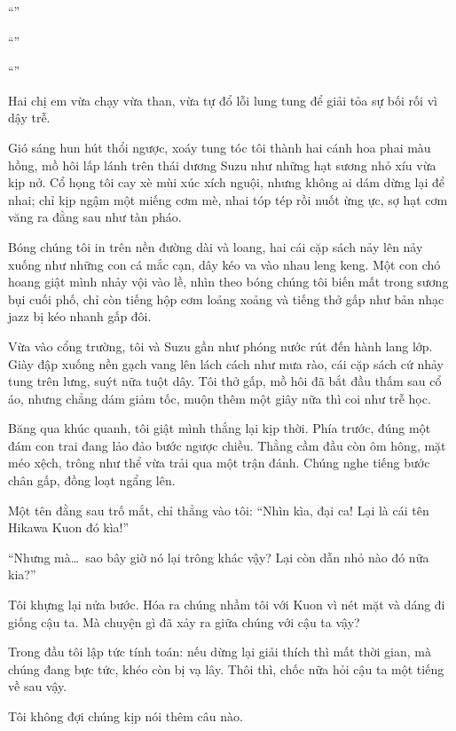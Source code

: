 \documentclass[../main.tex]{subfiles}
\begin{document}
``''

``''

``''

Hai chị em vừa chạy vừa than, vừa tự đổ lỗi lung tung để giải tỏa sự bối rối vì dậy trễ.

Gió sáng hun hút thổi ngược, xoáy tung tóc tôi thành hai cánh hoa phai màu hồng, mồ hôi lấp lánh trên thái dương Suzu như những hạt sương nhỏ xíu vừa kịp nở. Cổ họng tôi cay xè mùi xúc xích nguội, nhưng không ai dám dừng lại để nhai; chỉ kịp ngậm một miếng cơm mè, nhai tóp tép rồi nuốt ừng ực, sợ hạt cơm văng ra đằng sau như tàn pháo.

Bóng chúng tôi in trên nền đường dài và loang, hai cái cặp sách nảy lên nảy xuống như những con cá mắc cạn, dây kéo va vào nhau leng keng. Một con chó hoang giật mình nhảy vội vào lề, nhìn theo bóng chúng tôi biến mất trong sương bụi cuối phố, chỉ còn tiếng hộp cơm loảng xoảng và tiếng thở gấp như bản nhạc jazz bị kéo nhanh gấp đôi.

\ct

Vừa vào cổng trường, tôi và Suzu gần như phóng nước rút đến hành lang lớp. Giày đập xuống nền gạch vang lên lách cách như mưa rào, cái cặp sách cứ nhảy tung trên lưng, suýt nữa tuột dây. Tôi thở gấp, mồ hôi đã bắt đầu thấm sau cổ áo, nhưng chẳng dám giảm tốc, muộn thêm một giây nữa thì coi như trễ học.

Băng qua khúc quanh, tôi giật mình thắng lại kịp thời. Phía trước, đúng một đám con trai đang lảo đảo bước ngược chiều. Thằng cầm đầu còn ôm hông, mặt méo xệch, trông như thể vừa trải qua một trận đánh. Chúng nghe tiếng bước chân gấp, đồng loạt ngẩng lên.

Một tên đằng sau trố mắt, chỉ thẳng vào tôi: ``Nhìn kìa, đại ca! Lại là cái tên Hikawa Kuon đó kìa!''

``Nhưng mà\dots\ sao bây giờ nó lại trông khác vậy? Lại còn dẫn nhỏ nào đó nữa kia?''

Tôi khựng lại nửa bước. Hóa ra chúng nhầm tôi với Kuon vì nét mặt và dáng đi giống cậu ta. Mà chuyện gì đã xảy ra giữa chúng với cậu ta vậy?

Trong đầu tôi lập tức tính toán: nếu dừng lại giải thích thì mất thời gian, mà chúng đang bực tức, khéo còn bị vạ lây. Thôi thì, chốc nữa hỏi cậu ta một tiếng về sau vậy.

Tôi không đợi chúng kịp nói thêm câu nào.
\end{document}
